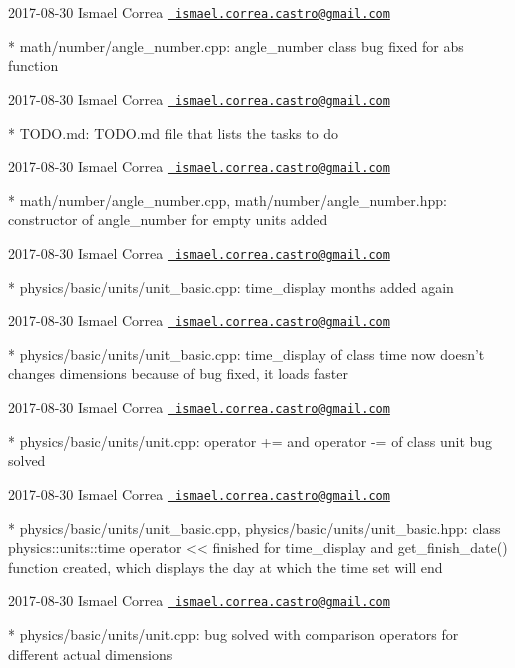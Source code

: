  2017-\/08-\/30 Ismael Correa \href{mailto:ismael.correa.castro@gmail.com}{\texttt{ ismael.\+correa.\+castro@gmail.\+com}} \begin{DoxyVerb}* math/number/angle_number.cpp: angle_number class bug fixed for abs
function
\end{DoxyVerb}
 2017-\/08-\/30 Ismael Correa \href{mailto:ismael.correa.castro@gmail.com}{\texttt{ ismael.\+correa.\+castro@gmail.\+com}} \begin{DoxyVerb}* TODO.md: TODO.md file that lists the tasks to do
\end{DoxyVerb}
 2017-\/08-\/30 Ismael Correa \href{mailto:ismael.correa.castro@gmail.com}{\texttt{ ismael.\+correa.\+castro@gmail.\+com}} \begin{DoxyVerb}* math/number/angle_number.cpp, math/number/angle_number.hpp: 
constructor of angle_number for empty units added
\end{DoxyVerb}
 2017-\/08-\/30 Ismael Correa \href{mailto:ismael.correa.castro@gmail.com}{\texttt{ ismael.\+correa.\+castro@gmail.\+com}} \begin{DoxyVerb}* physics/basic/units/unit_basic.cpp: time_display months added
again
\end{DoxyVerb}
 2017-\/08-\/30 Ismael Correa \href{mailto:ismael.correa.castro@gmail.com}{\texttt{ ismael.\+correa.\+castro@gmail.\+com}} \begin{DoxyVerb}* physics/basic/units/unit_basic.cpp: time_display of class time now
doesn't changes dimensions because of bug fixed, it loads faster
\end{DoxyVerb}
 2017-\/08-\/30 Ismael Correa \href{mailto:ismael.correa.castro@gmail.com}{\texttt{ ismael.\+correa.\+castro@gmail.\+com}} \begin{DoxyVerb}* physics/basic/units/unit.cpp: operator += and operator -= of class
unit bug solved
\end{DoxyVerb}
 2017-\/08-\/30 Ismael Correa \href{mailto:ismael.correa.castro@gmail.com}{\texttt{ ismael.\+correa.\+castro@gmail.\+com}} \begin{DoxyVerb}* physics/basic/units/unit_basic.cpp,
physics/basic/units/unit_basic.hpp: class physics::units::time
operator << finished for time_display and get_finish_date() function
created, which displays the day at which the time set will end
\end{DoxyVerb}
 2017-\/08-\/30 Ismael Correa \href{mailto:ismael.correa.castro@gmail.com}{\texttt{ ismael.\+correa.\+castro@gmail.\+com}} \begin{DoxyVerb}* physics/basic/units/unit.cpp: bug solved with comparison operators
for different actual dimensions
\end{DoxyVerb}
